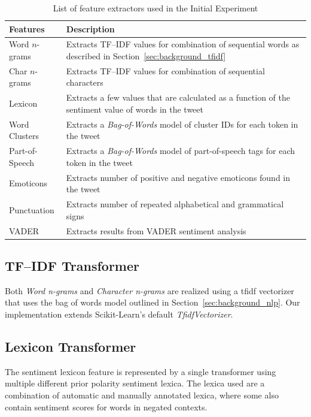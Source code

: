 \begin{table}[ht]
    \centering
    \begin{tabular}{| l | p{10cm} |}
        \hline
        \textbf{Features} & \textbf{Description} \\ \hline
        Word $n$-grams & Extracts TF--IDF values for combination of sequential words as described in Section~\ref{sec:background_tfidf} \\ \hline
        Char $n$-grams & Extracts TF--IDF values for combination of sequential characters \\ \hline
        Lexicon & Extracts a few values that are calculated as a function of the sentiment value of words in the tweet \\ \hline
        Word Clusters & Extracts a \textit{Bag-of-Words} model of cluster IDs for each token in the tweet \\ \hline
        Part-of-Speech & Extracts a \textit{Bag-of-Words} model of part-of-speech tags for each token in the tweet \\ \hline
        Emoticons & Extracts number of positive and negative emoticons found in the tweet \\ \hline
        Punctuation & Extracts number of repeated alphabetical and grammatical signs \\ \hline
        VADER & Extracts results from VADER sentiment analysis \\ \hline
    \end{tabular}
    \caption{List of feature extractors used in the Initial Experiment}
    \label{tab:feature_extractors}
\end{table}


\subsection*{TF--IDF Transformer}
Both \textit{Word n-grams} and \textit{Character n-grams} are realized using a \ac{tfidf} vectorizer that uses the bag of words model outlined in Section~\ref{sec:background_nlp}. Our implementation extends Scikit-Learn's default \textit{TfidfVectorizer}.


\subsection*{Lexicon Transformer}
The sentiment lexicon feature is represented by a single transformer using multiple different prior polarity sentiment lexica. The lexica used are a combination of automatic and manually annotated lexica, where some also contain sentiment scores for words in negated contexts. \\

